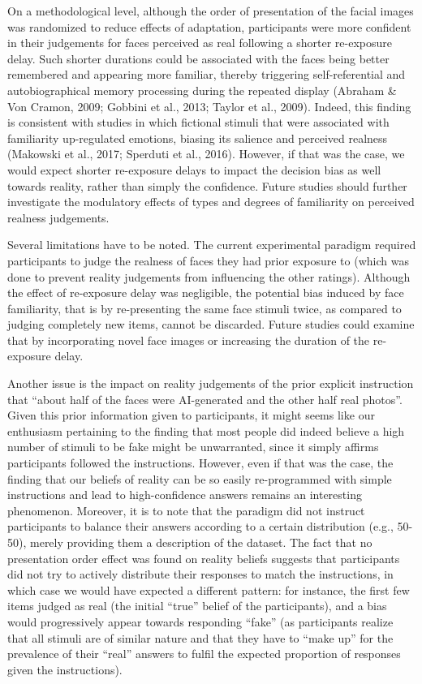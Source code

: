 \documentclass[
  man,
  floatsintext,
  longtable,
  nolmodern,
  notxfonts,
  notimes,
  colorlinks=true,linkcolor=blue,citecolor=blue,urlcolor=blue]{apa7}
\begin{document}
On a methodological level, although the order of presentation of the
facial images was randomized to reduce effects of adaptation,
participants were more confident in their judgements for faces perceived
as real following a shorter re-exposure delay. Such shorter durations
could be associated with the faces being better remembered and appearing
more familiar, thereby triggering self-referential and autobiographical
memory processing during the repeated display (Abraham \& Von Cramon,
2009; Gobbini et al., 2013; Taylor et al., 2009). Indeed, this finding
is consistent with studies in which fictional stimuli that were
associated with familiarity up-regulated emotions, biasing its salience
and perceived realness (Makowski et al., 2017; Sperduti et al., 2016).
However, if that was the case, we would expect shorter re-exposure
delays to impact the decision bias as well towards reality, rather than
simply the confidence. Future studies should further investigate the
modulatory effects of types and degrees of familiarity on perceived
realness judgements.

Several limitations have to be noted. The current experimental paradigm
required participants to judge the realness of faces they had prior
exposure to (which was done to prevent reality judgements from
influencing the other ratings). Although the effect of re-exposure delay
was negligible, the potential bias induced by face familiarity, that is
by re-presenting the same face stimuli twice, as compared to judging
completely new items, cannot be discarded. Future studies could examine
that by incorporating novel face images or increasing the duration of
the re-exposure delay.

Another issue is the impact on reality judgements of the prior explicit
instruction that ``about half of the faces were AI-generated and the
other half real photos''. Given this prior information given to
participants, it might seems like our enthusiasm pertaining to the
finding that most people did indeed believe a high number of stimuli to
be fake might be unwarranted, since it simply affirms participants
followed the instructions. However, even if that was the case, the
finding that our beliefs of reality can be so easily re-programmed with
simple instructions and lead to high-confidence answers remains an
interesting phenomenon. Moreover, it is to note that the paradigm did
not instruct participants to balance their answers according to a
certain distribution (e.g., 50-50), merely providing them a description
of the dataset. The fact that no presentation order effect was found on
reality beliefs suggests that participants did not try to actively
distribute their responses to match the instructions, in which case we
would have expected a different pattern: for instance, the first few
items judged as real (the initial ``true'' belief of the participants),
and a bias would progressively appear towards responding ``fake'' (as
participants realize that all stimuli are of similar nature and that
they have to ``make up'' for the prevalence of their ``real'' answers to
fulfil the expected proportion of responses given the instructions).
\end{document}
